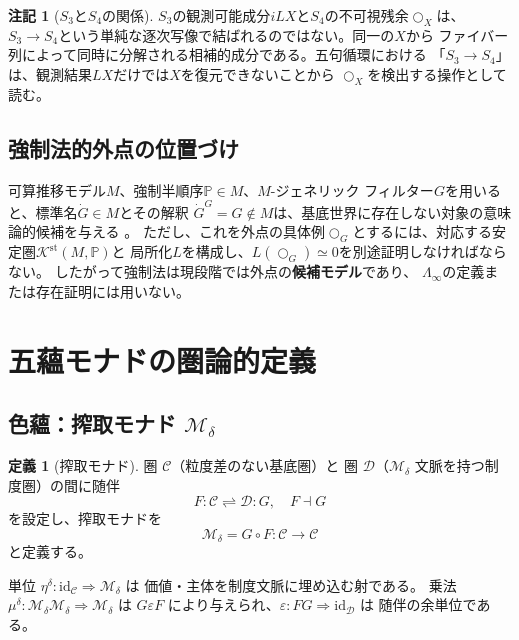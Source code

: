 \documentclass[11pt,a4paper]{ltjsarticle}
\theoremstyle{definition}
\newtheorem{definition}{定義}[section]
\newtheorem{remark}{注記}[section]
\newcommand{\id}{\mathrm{id}}
\newcommand{\Mdelta}{\mathcal{M}_{\delta}}
\newcommand{\LawvereInfinity}{\Lambda_\infty}
\newcommand{\Kstab}{\mathcal{K}^{\mathrm{st}}}
\begin{document}
\begin{remark}[$S_3$と$S_4$の関係]
$S_3$の観測可能成分$iLX$と$S_4$の不可視残余$\bigcirc_X$は、
$S_3\to S_4$という単純な逐次写像で結ばれるのではない。同一の$X$から
ファイバー列によって同時に分解される相補的成分である。五句循環における
「$S_3\to S_4$」は、観測結果$LX$だけでは$X$を復元できないことから
$\bigcirc_X$を検出する操作として読む。
\end{remark}

\subsection{強制法的外点の位置づけ}

可算推移モデル$M$、強制半順序$\mathbb{P}\in M$、$M$-ジェネリック
フィルター$G$を用いると、標準名$\dot G\in M$とその解釈
$\dot G^G=G\notin M$は、基底世界に存在しない対象の意味論的候補を与える
\cite{Jech2003}。
ただし、これを外点の具体例$\bigcirc_G$とするには、対応する安定圏$\Kstab(M,\mathbb P)$と
局所化$L$を構成し、$L(\bigcirc_G)\simeq0$を別途証明しなければならない。
したがって強制法は現段階では外点の\textbf{候補モデル}であり、
$\LawvereInfinity$の定義または存在証明には用いない。

\section{五蘊モナドの圏論的定義}

\subsection{色蘊：搾取モナド \texorpdfstring{$\Mdelta$}{M-delta}}

\begin{definition}[搾取モナド]
圏 $\mathcal{C}$（粒度差のない基底圏）と
圏 $\mathcal{D}$（$\Mdelta$ 文脈を持つ制度圏）の間に随伴
\begin{equation}
F : \mathcal{C} \rightleftharpoons \mathcal{D} : G, \quad F \dashv G
\end{equation}
を設定し、搾取モナドを
\begin{equation}
\Mdelta = G \circ F : \mathcal{C} \to \mathcal{C}
\end{equation}
と定義する。

単位 $\eta^\delta : \id_{\mathcal{C}} \Rightarrow \Mdelta$ は
価値・主体を制度文脈に埋め込む射である。
乗法 $\mu^\delta : \Mdelta\Mdelta \Rightarrow \Mdelta$ は
$G\varepsilon F$ により与えられ、$\varepsilon : FG \Rightarrow \id_{\mathcal{D}}$ は
随伴の余単位である。
\end{definition}
\end{document}
